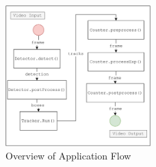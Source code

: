\documentclass[12pt,a4paper,fleqn]{report}
\begin{document}
\begin{figure}[htbp]
    \begin{center}
        \includegraphics[width=0.5\textwidth]{figures/systemflow.png}
    \end{center}
    \caption{Overview of Application Flow}
    \label{fig:systemflow}
\end{figure}
\end{document}
